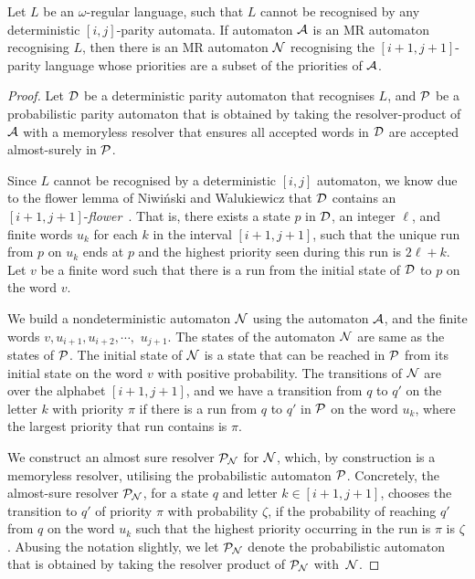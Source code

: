 \begin{lemma}\label{lemma:index-hierarchy-reduction-to-parity-language}
    Let $L$ be an $\omega$-regular language, such that $L$ cannot be recognised by any deterministic $[i,j]$-parity automata. If automaton $\mathcal{A}$ is an MR automaton recognising $L$, then there is an MR automaton $\mathcal{N}$ recognising the $[i+1,j+1]$-parity language  whose priorities are a subset of the priorities of $\mathcal{A}$. 
\end{lemma}
\begin{proof}
     Let $\mathcal{D}$ be a deterministic parity automaton that recognises $L$, and $\mathcal{P}$ be a probabilistic parity automaton that is obtained by taking the resolver-product of $\mathcal{A}$ with a memoryless resolver that ensures all accepted words in $\mathcal{D}$ are accepted almost-surely in $\mathcal{P}$.
     
     Since $L$ cannot be recognised by a deterministic $[i,j]$ automaton, we know due to the flower lemma of Niwi\'nski and Walukiewicz that $\mathcal{D}$ contains an $[i+1,j+1]$-\emph{flower}~\cite[Lemma 14]{NW98}. That is, there exists a state $p$ in $\mathcal{D}$, an integer $\ell$, and finite words $u_{k}$ for each $k$ in the interval $[i+1,j+1]$, such that the unique run from $p$ on $u_k$ ends at $p$ and the highest priority seen during this run is $2\ell+k$. Let $v$ be a finite word such that there is a run from the initial state of $\mathcal{D}$ to $p$ on the word $v$.

     We build a nondeterministic automaton $\mathcal{N}$ using the automaton $\mathcal{A}$, and the finite words $v,u_{i+1},u_{i+2},\cdots,$ $u_{j+1}$. The states of the automaton $\mathcal{N}$ are same as the states of $\mathcal{P}$. The initial state of $\mathcal{N}$ is a state that can be reached in $\mathcal{P}$ from its initial state on the word $v$ with positive probability. The transitions of $\mathcal{N}$ are over the alphabet $[i+1,j+1]$, and we have a transition from $q$ to $q'$ on the letter $k$ with priority $\pi$ if there is a run from $q$ to $q'$ in $\mathcal{P}$ on the word $u_k$, where the largest priority that run contains is $\pi$. 
     
     We construct an almost sure resolver $\mathcal{P}_{\mathcal{N}}$ for $\mathcal{N}$, which, by construction is a memoryless resolver, utilising the probabilistic automaton $\mathcal{P}$. Concretely, the almost-sure resolver $\mathcal{P}_{\mathcal{N}}$, for a state $q$ and letter $k\in [i+1,j+1]$, chooses the transition to $q'$ of priority $\pi$ with probability $\zeta$, if the probability of reaching $q'$ from $q$ on the word $u_k$ such that the highest priority occurring in the run is $\pi$ is $\zeta$. Abusing the notation slightly, we let $\mathcal{P}_{\mathcal{N}}$ denote the probabilistic automaton that is obtained by taking the resolver product of $\mathcal{P}_{\mathcal{N}}$ with~$\mathcal{N}$.


\end{proof}
